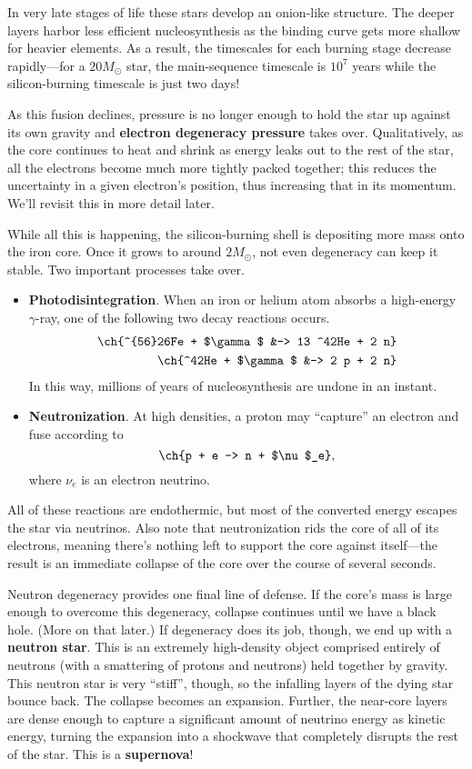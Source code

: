 \documentclass[../a062main.tex]{subfiles}
\begin{document}
In very late stages of life these stars develop an onion-like structure.
The deeper layers harbor less efficient nucleosynthesis as the binding curve gets more shallow for heavier elements.
As a result, the timescales for each burning stage decrease rapidly---for a $20M_\odot$ star, the main-sequence timescale is $10^{7}$ years while the silicon-burning timescale is just two days!

As this fusion declines, pressure is no longer enough to hold the star up against its own gravity and \textbf{electron degeneracy pressure} takes over.
Qualitatively, as the core continues to heat and shrink as energy leaks out to the rest of the star, all the electrons become much more tightly packed together; this reduces the uncertainty in a given electron's position, thus increasing that in its momentum.
We'll revisit this in more detail later.

While all this is happening, the silicon-burning shell is depositing more mass onto the iron core.
Once it grows to around $2M_\odot$, not even degeneracy can keep it stable.
Two important processes take over.
\begin{itemize}
    \item \textbf{Photodisintegration}.
    When an iron or helium atom absorbs a high-energy $\gamma$-ray, one of the following two decay reactions occurs.
    \begin{align*}
        \ch{^{56}26Fe + $\gamma$ &-> 13 ^42He + 2 n} \\
        \ch{^42He + $\gamma$ &-> 2 p + 2 n}
    \end{align*}
    In this way, millions of years of nucleosynthesis are undone in an instant.

    \item \textbf{Neutronization}.
    At high densities, a proton may ``capture'' an electron and fuse according to
    \[ \ch{p + e -> n + $\nu$_e}, \]
    where $\nu_e$ is an electron neutrino.
\end{itemize}
All of these reactions are endothermic, but most of the converted energy escapes the star via neutrinos.
Also note that neutronization rids the core of all of its electrons, meaning there's nothing left to support the core against itself---the result is an immediate collapse of the core over the course of several seconds.

Neutron degeneracy provides one final line of defense.
If the core's mass is large enough to overcome this degeneracy, collapse continues until we have a black hole.
(More on that later.)
If degeneracy does its job, though, we end up with a \textbf{neutron star}.
This is an extremely high-density object comprised entirely of neutrons (with a smattering of protons and neutrons) held together by gravity.
This neutron star is very ``stiff'', though, so the infalling layers of the dying star bounce back.
The collapse becomes an expansion.
Further, the near-core layers are dense enough to capture a significant amount of neutrino energy as kinetic energy, turning the expansion into a shockwave that completely disrupts the rest of the star.
This is a \textbf{supernova}!
\end{document}
